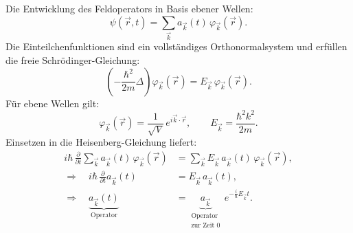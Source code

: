 Die Entwicklung des Feldoperators in Basis ebener
Wellen:
\begin{equation}
  \psi(\vec r,t)=\sum_{\vec k} a_{\vec k}(t)\,\varphi_{\vec k}(\vec r).
\end{equation}
Die Einteilchenfunktionen sind ein vollständiges Orthonormalsystem und erfüllen die freie Schrödinger-Gleichung:
\begin{equation}
  \left(-\frac{\hbar^2}{2m}\Delta\right)\varphi_{\vec k}(\vec r)=E_{\vec k}\,\varphi_{\vec k}(\vec r).
\end{equation}
Für ebene Wellen gilt:
\begin{equation}
  \varphi_{\vec k}(\vec r)=\frac{1}{\sqrt{V}}\,e^{i\vec k\cdot\vec r},
  \qquad
  E_{\vec k}=\frac{\hbar^2 k^2}{2m}.
\end{equation}
Einsetzen in die Heisenberg-Gleichung liefert:
\begin{equation}
  \label{f:zeitentwOperatoren}
  \begin{aligned}
    i\hbar\,\frac{\partial}{\partial t}\sum_{\vec k} a_{\vec k}(t)\,\varphi_{\vec k}(\vec r)
     & = \sum_{\vec k} E_{\vec k}\,a_{\vec k}(t)\,\varphi_{\vec k}(\vec r), \\
    \Rightarrow\quad i\hbar\,\frac{\partial}{\partial t}a_{\vec k}(t)
     & = E_{\vec k}\,a_{\vec k}(t),                                         \\
    \Rightarrow\quad \underbrace{a_{\vec k}(t)}_{\text{Operator}}
     & = \underbrace{a_{\vec k}}_{\substack{\text{Operator}                 \\
             \text{zur Zeit }0}}\,e^{-\frac{i}{\hbar}E_{\vec k} t}.
  \end{aligned}
\end{equation}

